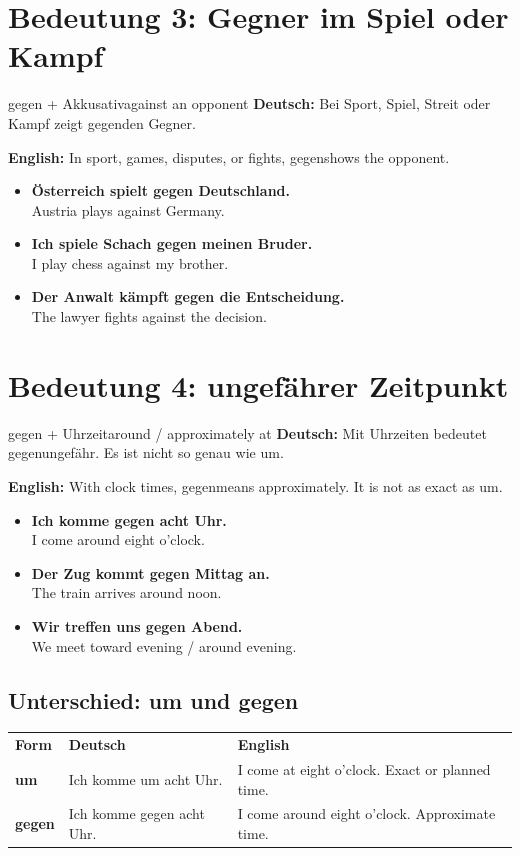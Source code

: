 \documentclass[a4paper,11pt]{article}
\newcommand{\GermanText}[1]{\textbf{Deutsch: }#1\par}
\newcommand{\EnglishText}[1]{{\small\color{SoftGray}\textbf{English: }#1\par}}
\newcommand{\ExampleItem}[2]{\item \textbf{#1}\\{\small\color{SoftGray}#2}}
\begin{document}
\section{Bedeutung 3: Gegner im Spiel oder Kampf}

\begin{grammarentry}{gegen + Akkusativ}{against an opponent}
\GermanText{Bei Sport, Spiel, Streit oder Kampf zeigt \glqq gegen\grqq den Gegner.}
\EnglishText{In sport, games, disputes, or fights, \glqq gegen\grqq shows the opponent.}
\end{grammarentry}

\begin{exbox}
\begin{itemize}
    \ExampleItem{Österreich spielt gegen Deutschland.}{Austria plays against Germany.}
    \ExampleItem{Ich spiele Schach gegen meinen Bruder.}{I play chess against my brother.}
    \ExampleItem{Der Anwalt kämpft gegen die Entscheidung.}{The lawyer fights against the decision.}
\end{itemize}
\end{exbox}

\section{Bedeutung 4: ungefährer Zeitpunkt}

\begin{grammarentry}{gegen + Uhrzeit}{around / approximately at}
\GermanText{Mit Uhrzeiten bedeutet \glqq gegen\grqq ungefähr. Es ist nicht so genau wie \glqq um\grqq.}
\EnglishText{With clock times, \glqq gegen\grqq means approximately. It is not as exact as \glqq um\grqq.}
\end{grammarentry}

\begin{exbox}
\begin{itemize}
    \ExampleItem{Ich komme gegen acht Uhr.}{I come around eight o'clock.}
    \ExampleItem{Der Zug kommt gegen Mittag an.}{The train arrives around noon.}
    \ExampleItem{Wir treffen uns gegen Abend.}{We meet toward evening / around evening.}
\end{itemize}
\end{exbox}

\subsection{Unterschied: um und gegen}

\begin{tabularx}{\textwidth}{>{\bfseries}p{}X X}
\rowcolor{HeaderBlueDark}
\color{white}\textbf{Form} & \color{white}\textbf{Deutsch} & \color{white}\textbf{English} \\
um & Ich komme um acht Uhr. & I come at eight o'clock. Exact or planned time. \\
gegen & Ich komme gegen acht Uhr. & I come around eight o'clock. Approximate time. \\
\end{tabularx}
\end{document}
